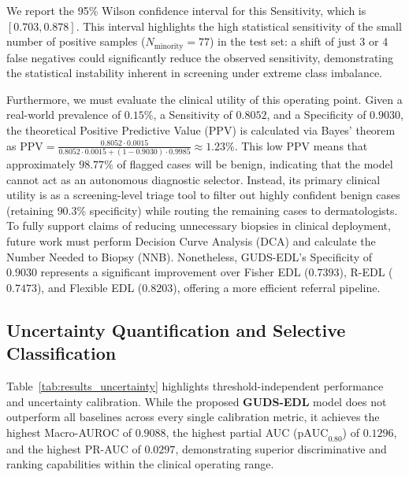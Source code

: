 \documentclass[letterpaper]{article} %
\begin{document}
We report the 95\% Wilson confidence interval for this Sensitivity, which is $[0.703, 0.878]$. This interval highlights the high statistical sensitivity of the small number of positive samples ($N_{\text{minority}} = 77$) in the test set: a shift of just 3 or 4 false negatives could significantly reduce the observed sensitivity, demonstrating the statistical instability inherent in screening under extreme class imbalance.

Furthermore, we must evaluate the clinical utility of this operating point. Given a real-world prevalence of $0.15\%$, a Sensitivity of $0.8052$, and a Specificity of $0.9030$, the theoretical Positive Predictive Value (PPV) is calculated via Bayes' theorem as $\text{PPV} = \frac{0.8052 \cdot 0.0015}{0.8052 \cdot 0.0015 + (1 - 0.9030) \cdot 0.9985} \approx 1.23\%$. This low PPV means that approximately $98.77\%$ of flagged cases will be benign, indicating that the model cannot act as an autonomous diagnostic selector. Instead, its primary clinical utility is as a screening-level triage tool to filter out highly confident benign cases (retaining $90.3\%$ specificity) while routing the remaining cases to dermatologists. To fully support claims of reducing unnecessary biopsies in clinical deployment, future work must perform Decision Curve Analysis (DCA) and calculate the Number Needed to Biopsy (NNB). Nonetheless, GUDS-EDL's Specificity of $0.9030$ represents a significant improvement over Fisher EDL ($0.7393$), R-EDL ($0.7473$), and Flexible EDL ($0.8203$), offering a more efficient referral pipeline.

\subsection{Uncertainty Quantification and Selective Classification}
Table~\ref{tab:results_uncertainty} highlights threshold-independent performance and uncertainty calibration. While the proposed \textbf{GUDS-EDL} model does not outperform all baselines across every single calibration metric, it achieves the highest Macro-AUROC of $\mathbf{0.9088}$, the highest partial AUC ($\text{pAUC}_{0.80}$) of $\mathbf{0.1296}$, and the highest PR-AUC of $\mathbf{0.0297}$, demonstrating superior discriminative and ranking capabilities within the clinical operating range.
\end{document}
